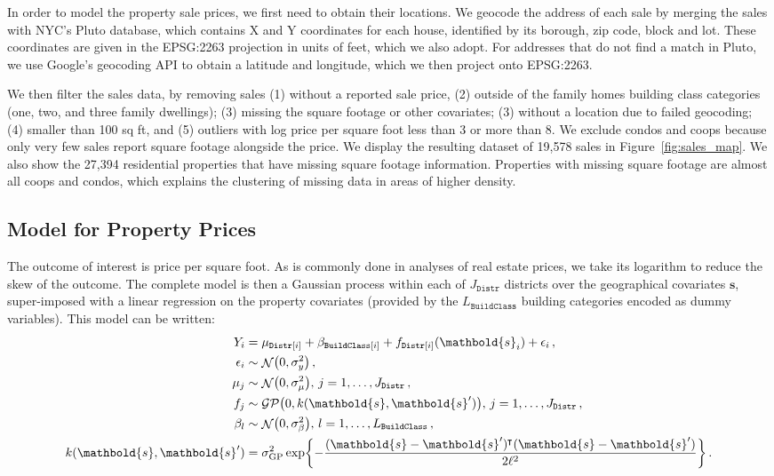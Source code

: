 \documentclass[letter,12pt]{article}
\DeclarePairedDelimiter{\parenthesis}{\lparen}{\rparen}
\DeclarePairedDelimiter{\squarebracket}{\lbrack}{\rbrack}
\DeclarePairedDelimiter{\curlybracket}{\lbrace}{\rbrace}
\newcommand{\del}[1]{\parenthesis*{#1}}
\newcommand{\sbr}[1]{\squarebracket*{#1}}
\newcommand{\cbr}[1]{\curlybracket*{#1}}
\DeclareMathOperator{\normal}{\mathcal{N}}
\DeclareMathOperator{\GP}{\mathcal{GP}}
\newcommand{\building}{\mathtt{BuildClass}}
\newcommand{\district}{\mathtt{Distr}}
\newcommand*{\trans}{^{\mkern-1.5mu\intercal}}
\newcommand{\sigmaf}{\sigma_{\mathrm{GP}}}
\newcommand{\sigmamu}{\sigma_{\mu}}
\newcommand{\svec}{\mathbold{s}}
\begin{document}
In order to model the property sale prices, we first need to obtain their locations.
We geocode the address of each sale by merging the sales with NYC's Pluto database, which contains X and Y coordinates for each house, identified by its borough, zip code, block and lot.
These coordinates are given in the EPSG:2263 projection in units of feet, which we also adopt.
For addresses that do not find a match in Pluto, we use Google's geocoding API to obtain a latitude and longitude, which we then project onto EPSG:2263.

We then filter the sales data, by removing sales (1) without a reported sale price, (2) outside of the family homes building class categories (one, two, and three family dwellings); (3) missing the square footage or other covariates; (3) without a location due to failed geocoding; (4) smaller than 100 sq ft, and (5) outliers with log price per square foot less than 3 or more than 8.
We exclude condos and coops because only very few sales report square footage alongside the price.
We display the resulting dataset of 19,578 sales in Figure~\ref{fig:sales_map}.
We also show the 27,394 residential properties that have missing square footage information.
Properties with missing square footage are almost all coops and condos, which explains the clustering of missing data in areas of higher density.

\hypertarget{model-for-property-prices}{%
\subsection{Model for Property Prices}\label{model-for-property-prices}}

The outcome of interest is price per square foot.
As is commonly done in analyses of real estate prices, we take its logarithm to reduce the skew of the outcome.
The complete model is then a Gaussian process within each of \(J_\district\) districts over the geographical covariates \(\svec\), super-imposed with a linear regression on the property covariates (provided by the \(L_\building\) building categories encoded as dummy variables).
This model can be written:
\begin{equation}
    \begin{split}
        Y_i &= %
        \mu_{\district\sbr{i}} + \beta_{\building\sbr{i}}
        + f_{\district\sbr{i}}(\svec_i) + \epsilon_i \,,
        \\
        \epsilon_i &\sim \normal\del{0, \sigma_y^2} \,, \\
        \mu_{j} &\sim \normal\del{0, \sigmamu^2},\,j=1,\dotsc,J_\district \,, \\
        f_j &\sim \GP\del{0, k(\svec, \svec')},\,j=1,\dotsc,J_\district \,, \\
        \beta_{l} &\sim \normal\del{0, \sigma_\beta^2},\,l=1,\dotsc,L_\building \,, \\
        k(\svec, \svec') &= \sigmaf^2 \exp\cbr{ - \frac{(\svec-\svec')\trans(\svec-\svec')}{2\ell^2}} \,.
    \end{split}
    \label{eq:nyc_model}
\end{equation}
\end{document}
